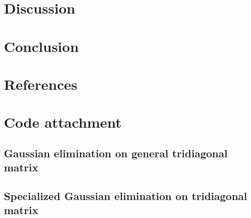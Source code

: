 \documentclass[norsk,a4paper,12pt]{article}
\begin{document}
\section{Discussion}
\section{Conclusion}
\section{References}
\section{Code attachment}
%
\subsection{Gaussian elimination on general tridiagonal matrix}

\subsection{Specialized Gaussian elimination on tridiagonal matrix}

\end{document}
